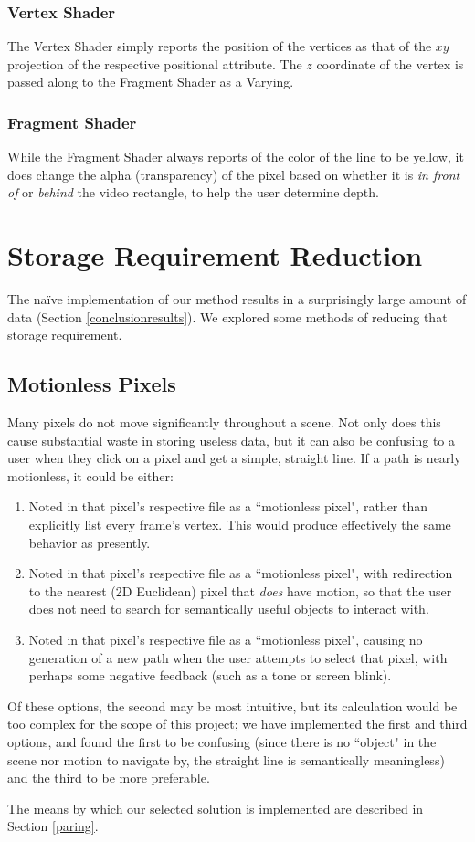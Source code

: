\subsubsection{Vertex Shader}
The Vertex Shader simply reports the position of the vertices as that of the $xy$ projection of the respective positional attribute. The $z$ coordinate of the vertex is passed along to the Fragment Shader as a Varying.

\subsubsection{Fragment Shader}
While the Fragment Shader always reports of the color of the line to be yellow, it does change the alpha (transparency) of the pixel based on whether it is \emph{in front of} or \emph{behind} the video rectangle, to help the user determine depth.

\section{Storage Requirement Reduction}
The na{\"i}ve implementation of our method results in a surprisingly large amount of data (Section \ref{conclusionresults}). We explored some methods of reducing that storage requirement.

\subsection{Motionless Pixels}
    Many pixels do not move significantly throughout a scene. Not only does this cause substantial waste in storing useless data, but it can also be confusing to a user when they click on a pixel and get a simple, straight line. If a path is nearly motionless, it could be either:
    \begin{enumerate}
        \item Noted in that pixel's respective file as a ``motionless pixel", rather than explicitly list every frame's vertex. This would produce effectively the same behavior as presently.
        \item Noted in that pixel's respective file as a ``motionless pixel", with redirection to the nearest (2D Euclidean) pixel that \emph{does} have motion, so that the user does not need to search for semantically useful objects to interact with.
        \item Noted in that pixel's respective file as a ``motionless pixel", causing no generation of a new path when the user attempts to select that pixel, with perhaps some negative feedback (such as a tone or screen blink).
    \end{enumerate}
    \par Of these options, the second may be most intuitive, but its calculation would be too complex for the scope of this project; we have implemented the first and third options, and found the first to be confusing (since there is no ``object" in the scene nor motion to navigate by, the straight line is semantically meaningless) and the third to be more preferable.
    \par The means by which our selected solution is implemented are described in Section \ref{paring}.

